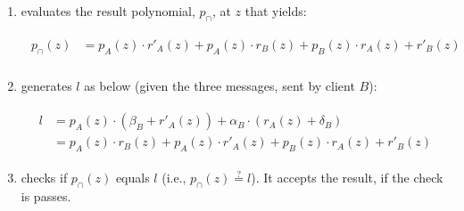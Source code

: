 \begin{enumerate}

\item evaluates the result polynomial, $p_{\scriptscriptstyle \cap}$, at $z$ that yields:


\begin{align*}
\begin{split}
p_{\scriptscriptstyle \cap}(z)&=  p_{\scriptscriptstyle A}(z)\cdot r'_{\scriptscriptstyle A}(z)+p_{\scriptscriptstyle A}(z)\cdot r_{\scriptscriptstyle B}(z)+p_{\scriptscriptstyle B}(z)\cdot r_{\scriptscriptstyle A}(z)+ r'_{\scriptscriptstyle B}(z)\\
\end{split}
\end{align*}

\item  generates $l$ as below (given the three messages, sent by client $B$):


\begin{align*}%
\begin{split}
l&=p_{\scriptscriptstyle A}(z)\cdot(\beta_{\scriptscriptstyle B}+r'_{\scriptscriptstyle A}(z))+\alpha_{\scriptscriptstyle B}\cdot(r_{\scriptscriptstyle A}(z)+\delta_{\scriptscriptstyle B}) \\
&=p_{\scriptscriptstyle A}(z)\cdot r_{\scriptscriptstyle B}(z)+p_{\scriptscriptstyle A}(z)\cdot r'_{\scriptscriptstyle A}(z)+p_{\scriptscriptstyle B}(z)\cdot r_{\scriptscriptstyle A}(z)+r'_{\scriptscriptstyle B}(z)
 \end{split}
 \end{align*}

\item checks if $p_{\scriptscriptstyle \cap}(z)$ equals  $l$ (i.e., $p_{\scriptscriptstyle \cap}(z)\stackrel{\scriptscriptstyle ?}=l$). It accepts the result, if the check is passes.

\end{enumerate}

%

